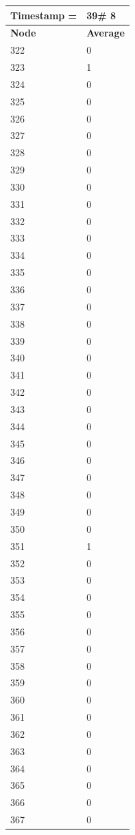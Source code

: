 \begin{tabular}{|l||l|}
\hline
\textbf{Timestamp =} & \textbf{39}\# 8\\\hline
	\textbf{Node} & \textbf{Average} \\ \hline
\hline
	322 & 0 \\ \hline
	323 & 1 \\ \hline
	324 & 0 \\ \hline
	325 & 0 \\ \hline
	326 & 0 \\ \hline
	327 & 0 \\ \hline
	328 & 0 \\ \hline
	329 & 0 \\ \hline
	330 & 0 \\ \hline
	331 & 0 \\ \hline
	332 & 0 \\ \hline
	333 & 0 \\ \hline
	334 & 0 \\ \hline
	335 & 0 \\ \hline
	336 & 0 \\ \hline
	337 & 0 \\ \hline
	338 & 0 \\ \hline
	339 & 0 \\ \hline
	340 & 0 \\ \hline
	341 & 0 \\ \hline
	342 & 0 \\ \hline
	343 & 0 \\ \hline
	344 & 0 \\ \hline
	345 & 0 \\ \hline
	346 & 0 \\ \hline
	347 & 0 \\ \hline
	348 & 0 \\ \hline
	349 & 0 \\ \hline
	350 & 0 \\ \hline
	351 & 1 \\ \hline
	352 & 0 \\ \hline
	353 & 0 \\ \hline
	354 & 0 \\ \hline
	355 & 0 \\ \hline
	356 & 0 \\ \hline
	357 & 0 \\ \hline
	358 & 0 \\ \hline
	359 & 0 \\ \hline
	360 & 0 \\ \hline
	361 & 0 \\ \hline
	362 & 0 \\ \hline
	363 & 0 \\ \hline
	364 & 0 \\ \hline
	365 & 0 \\ \hline
	366 & 0 \\ \hline
	367 & 0 \\ \hline
\end{tabular}
